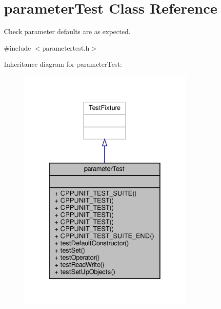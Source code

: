 \hypertarget{classparameterTest}{}\section{parameter\+Test Class Reference}
\label{classparameterTest}


Check parameter defaults are as expected.  




{\ttfamily \#include $<$parametertest.\+h$>$}



Inheritance diagram for parameter\+Test\+:\nopagebreak
\begin{figure}[H]
\begin{center}
\leavevmode
\includegraphics[width=250pt]{classparameterTest__inherit__graph}
\end{center}
\end{figure}


